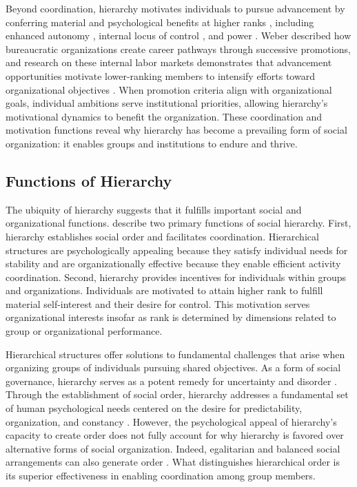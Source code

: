 Beyond coordination, hierarchy motivates individuals to pursue advancement by conferring material and psychological benefits at higher ranks \citep{Tannenbaum-1974-Hierarchy}, including enhanced autonomy \citep{Deci-1987-Support, Porter-1962-JobAttitudes}, internal locus of control \citep{Rotter-1966-GeneralizedExpectancies}, and power \citep{McClelland-1975-Power, Winter-1973-Power}. Weber \citeyearpar{Weber-1946-Essays} described how bureaucratic organizations create career pathways through successive promotions, and research on these internal labor markets demonstrates that advancement opportunities motivate lower-ranking members to intensify efforts toward organizational objectives \citep{Baron-1986-Structure, Pfeffer-1984-Determinants}. When promotion criteria align with organizational goals, individual ambitions serve institutional priorities, allowing hierarchy's motivational dynamics to benefit the organization. These coordination and motivation functions reveal why hierarchy has become a prevailing form of social organization: it enables groups and institutions to endure and thrive.


\subsection{Functions of Hierarchy}

The ubiquity of hierarchy suggests that it fulfills important social and organizational functions. \citet{Magee-2008-SocialHierarchy} describe two primary functions of social hierarchy. First, hierarchy establishes social order and facilitates coordination. Hierarchical structures are psychologically appealing because they satisfy individual needs for stability and are organizationally effective because they enable efficient activity coordination. Second, hierarchy provides incentives for individuals within groups and organizations. Individuals are motivated to attain higher rank to fulfill material self-interest and their desire for control. This motivation serves organizational interests insofar as rank is determined by dimensions related to group or organizational performance.

Hierarchical structures offer solutions to fundamental challenges that arise when organizing groups of individuals pursuing shared objectives. As a form of social governance, hierarchy serves as a potent remedy for uncertainty and disorder \citep{Durkheim-1997-Division, Hogg-2001-Social, Marx-1992-Early}. Through the establishment of social order, hierarchy addresses a fundamental set of human psychological needs centered on the desire for predictability, organization, and constancy \citep{Frenkel-1949-Intolerance, Sorrentino-1986-Uncertainty}. However, the psychological appeal of hierarchy's capacity to create order does not fully account for why hierarchy is favored over alternative forms of social organization. Indeed, egalitarian and balanced social arrangements can also generate order \citep{Krackhardt-1999-WhetherCloseOrFar}. What distinguishes hierarchical order is its superior effectiveness in enabling coordination among group members.

